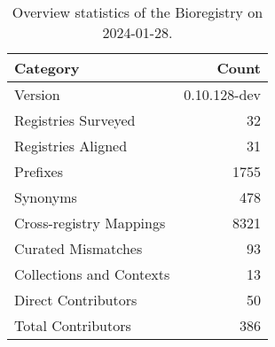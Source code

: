 \begin{table}
\caption{Overview statistics of the Bioregistry on 2024-01-28.}
\label{tab:bioregistry-summary}
\begin{tabular}{lr}
\toprule
Category & Count \\
\midrule
Version & 0.10.128-dev \\
Registries Surveyed & 32 \\
Registries Aligned & 31 \\
Prefixes & 1755 \\
Synonyms & 478 \\
Cross-registry Mappings & 8321 \\
Curated Mismatches & 93 \\
Collections and Contexts & 13 \\
Direct Contributors & 50 \\
Total Contributors & 386 \\
\bottomrule
\end{tabular}
\end{table}
